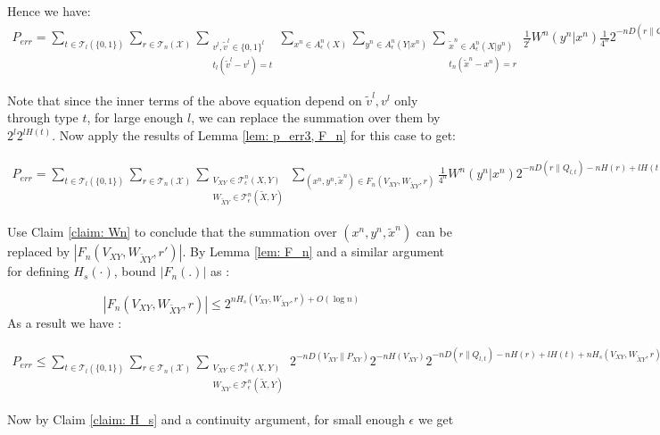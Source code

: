 Hence we have:
\begin{align}
P_{err}=\sum_{t\in \mathcal{T}_l(\{ 0,1\})}\sum_{r \in \mathcal{T}_n(\mathcal{X}) } \sum_{\substack{v^l, \tilde{v}^l \in \{0, 1\}^l\\ t_l(\tilde{v}^l- v^l)=t}}  \sum_{x^n\in A_\epsilon^n(X)} \sum_{y^n\in A_\epsilon^n(Y|x^n)}\sum_{\substack{\tilde{x}^n\in A_\epsilon^n(X|y^n)\\ t_n(\tilde{x}^n- x^n)=r}} \frac{1}{2^l} W^n(y^n|x^n) \frac{1}{4^n}2^{-nD(r\| Q_{l,t})-nH(r)}
\end{align}

Note that since the inner terms of the above equation depend on $\tilde{v}^l, v^l$ only through type $t$, for large enough $l$, we can replace the summation over them by $2^l 2^{lH(t)}$. Now apply the results of  Lemma \ref{lem: p_err3, F_n} for this case to get:

\begin{align} \label{equ: p_e_extra_for v}
P_{err}=\sum_{t\in \mathcal{T}_l(\{ 0,1\})}\sum_{r \in \mathcal{T}_n(\mathcal{X}) } \sum_{\substack{V_{XY}\in \mathcal{T}_\epsilon^n(X,Y)\\ W_{\tilde{X}Y}\in  \mathcal{T}_\epsilon^n(\tilde{X},Y) }} \sum_{(x^n,y^n,\tilde{x}^n)\in F_n(V_{XY},W_{\tilde{X}Y},r)}  \frac{1}{4^n} W^n(y^n|x^n)2^{-nD(r\| Q_{l,t})-nH(r)+lH(t)}
\end{align} 

Use Claim \ref{claim: Wn} to conclude that the summation over $(x^n,y^n,\tilde{x}^n)$ can be replaced by $|F_n(V_{XY},W_{\tilde{X}Y},r')|$. By Lemma  \ref{lem: F_n} and a similar argument for defining  $H_s(\cdot)$, bound $|F_n(.)|$ as :

\begin{equation*}
| F_n(V_{XY},W_{\tilde{X}Y},r) | \leq 2^{nH_{s}(V_{XY},W_{\tilde{X}Y},r)+O(\log n)}
\end{equation*} 
 As a result we have :
 
 \begin{align}
P_{err}\leq \sum_{t\in \mathcal{T}_l(\{ 0,1\})}\sum_{r \in \mathcal{T}_n(\mathcal{X}) } \sum_{\substack{V_{XY}\in \mathcal{T}_\epsilon^n(X,Y)\\ W_{\tilde{X}Y}\in  \mathcal{T}_\epsilon^n(\tilde{X},Y) }}  2^{-nD(V_{XY}\| P_{XY})} 2^{-nH(V_{XY})} 2^{-nD(r\| Q_{l,t})-nH(r)+lH(t)+nH_{s}(V_{XY},W_{\tilde{X}Y},r)+O(\log n)}
\end{align} 

Now by Claim \ref{claim: H_s} and a  continuity argument, for small enough $\epsilon$ we get

